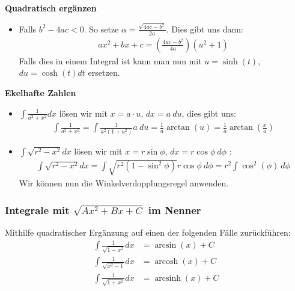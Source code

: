 \documentclass[25pt]{sciposter}
\newenvironment{method}[1]{\begin{mdframed}[backgroundcolor=blue!10,innertopmargin=15pt, innerbottommargin=15pt, nobreak=true]
		\textbf{#1 }
	}
	{ 
	\end{mdframed}
}
\begin{document}
\begin{multicols}{3}
\begin{method}{Quadratisch ergänzen}
\begin{itemize}
	\item Falls $b^2 - 4ac < 0$. So setze $\alpha = \frac{\sqrt{4ac - b^2}}{2a}$. Dies gibt uns dann:
	\begin{align*}
	ax^2 + bx + c = \left(\frac{4ac - b^2}{4a}\right)\left(u^2 + 1\right)
	\end{align*}
	Falls dies in einem Integral ist kann man nun mit $u=\sinh(t)$, $du = \cosh(t) dt$ ersetzen.
\end{itemize}

\end{method}

\begin{method}{Ekelhafte Zahlen}
	
	\begin{itemize}
	\item $\int \frac{1}{a^2 + x^2} dx$ lösen wir mit $x=a\cdot u$, $dx = a \ du$, dies gibt uns:
	\begin{align*}
		\int \frac{1}{a^2 + x^2} = \int\frac{1}{a^2 (1 + u^2)} a \ du = \frac{1}{a} \arctan(u) = \frac{1}{a} \arctan\left(\frac{x}{a}\right)
	\end{align*}
	
	\item $\int \sqrt{r^2 - x^2} dx$ lösen wir mit $x = r \sin \phi$, $dx = r \cos \phi \ d\phi$ :
	\begin{align*}
\int \sqrt{r^2 - x^2} dx = \int \sqrt{r^2 (1-\sin^2 \phi)} r \cos \phi \ d\phi = r^2 \int \cos^2(\phi) \ d\phi
\end{align*}
Wir können nun die Winkelverdopplungsregel anwenden.
	\end{itemize}
	
\end{method}

\subsubsection*{Integrale mit $\sqrt{Ax^2 + Bx + C}$ im Nenner}
Mithilfe quadratischer Ergänzung auf einen der folgenden Fälle zurückführen:
\begin{align*}
\int \frac{1}{\sqrt{1-x^2}} dx &= \arcsin(x) + C\\
\int \frac{1}{\sqrt{x^2-1}} dx &= \operatorname{arcosh}(x) + C\\
\int \frac{1}{\sqrt{1+x^2}} dx &= \operatorname{arcsinh}(x) + C
\end{align*}





\end{multicols}
\end{document}
